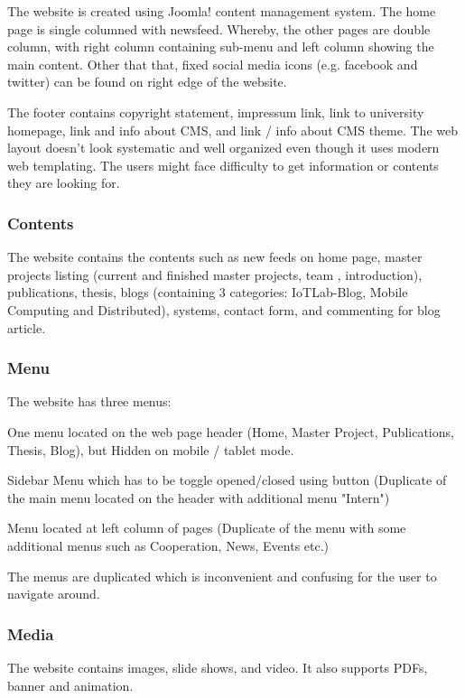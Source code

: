 The website is created using Joomla! content management system. The home page is single columned with newsfeed. Whereby, the other pages are double column, with right column containing sub-menu and left column showing the main content. Other that that, fixed social media icons (e.g. facebook and twitter) can be found on right edge of the website.

The footer contains copyright statement, impressum link, link to university homepage, link and info about CMS, and link / info about CMS theme. The web layout doesn't look systematic and well organized even though 
it uses modern web templating. The users might face difficulty to get  information or contents they are looking for.

\subsubsection*{Contents}
The website contains the contents such as new feeds on home page, master projects listing (current and finished master projects, team , introduction), publications, thesis, blogs (containing 3 categories: IoTLab-Blog, Mobile Computing and Distributed), systems, contact form, and commenting for blog article.

\subsubsection*{Menu}
The website has three menus:
\begin{itemize*}
\item One menu located on the web page header (Home, Master Project, Publications,  Thesis, Blog), but Hidden on mobile / tablet mode.
\item Sidebar Menu which has to be toggle opened/closed using button (Duplicate of  the main menu located on the header with additional menu "Intern")
\item Menu located at left column of pages (Duplicate of the menu with some  additional menus such as Cooperation, News, Events etc.)
\end{itemize*}

The menus are duplicated which is inconvenient and confusing for the user to navigate around.

\subsubsection*{Media}
The website contains images, slide shows, and video. It also supports PDFs, banner and animation.

